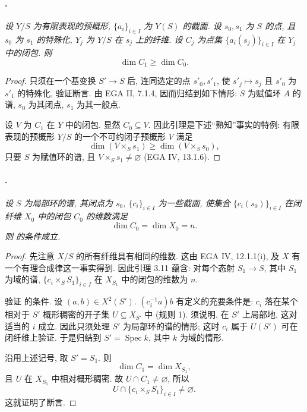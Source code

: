 \paragraph{.}
\textit{设 \(Y/S\) 为有限表现的预概形, \(\{a_i\}_{i\in I}\) 为 \(Y(S)\) 的截面.
设 \(s_0,s_1\) 为 \(S\) 的点, 且 \(s_0\) 为 \(s_1\) 的特殊化,
\(Y_j\) 为 \(Y/S\) 在 \(s_j\) 上的纤维.
设 \(C_j\) 为点集 \(\{a_i(s_j)\}_{i\in I}\) 在 \(Y_j\) 中的闭包. 则
\[
  \dim C_1\geq \dim C_0.
\]}

\begin{proof}
只须在一个基变换 \(S'\to S\) 后,
连同选定的点 \(s'_0,s'_1\), 使 \(s'_j\mapsto s_j\)
且 \(s'_0\) 为 \(s'_1\) 的特殊化, 验证断言.
由 EGA II, 7.1.4, 因而归结到如下情形:
\(S\) 为赋值环 \(A\) 的谱, \(s_0\) 为其闭点, \(s_1\) 为其一般点.

设 \(V\) 为 \(C_1\) 在 \(Y\) 中的闭包. 显然 \(C_0\subseteq V\).
因此引理是下述“熟知”事实的特例:
有限表现的预概形 \(Y/S\) 的一个不可约闭子预概形 \(V\) 满足
\[
  \dim(V\times_S s_1)\geq \dim(V\times_S s_0),
\]
只要 \(S\) 为赋值环的谱, 且 \(V\times_S s_1\neq\varnothing\)
(EGA IV, 13.1.6).
\end{proof}

\paragraph{.}
\textit{设 \(S\) 为局部环的谱, 其闭点为 \(s_0\),
\(\{c_i\}_{i\in I}\) 为一些截面,
使集合 \(\{c_i(s_0)\}_{i\in I}\) 在闭纤维 \(X_0\) 中的闭包 \(C_0\) 的维数满足
\[
  \dim C_0=\dim X_0=n.
\]
则 的条件成立.}

\begin{proof}
先注意 \(X/S\) 的所有纤维具有相同的维数.
这由 EGA IV, 12.1.1(i), 及 \(X\) 有一个有理合成律这一事实得到.
因此引理 3.11 蕴含: 对每个态射 \(S_1\to S\), 其中 \(S_1\) 为域的谱,
\(\{c_i\times_S S_1\}_{i\in I}\) 在 \(X_{S_1}\) 中的闭包的维数为 \(n\).

验证 的条件.
设 \((a,b)\in X^2(S')\).
\((c_i^{-1}a)b\) 有定义的充要条件是:
\(c_i\) 落在某个相对于 \(S'\) 概形稠密的开子集 \(U\subseteq X_{S'}\) 中 (规则 1).
须说明, 在 \(S'\) 上局部地, 这对适当的 \(i\) 成立.
因此只须处理 \(S'\) 为局部环的谱的情形;
这时 \(c_i\) 属于 \(U(S')\) 可在闭纤维上验证.
于是归结到 \(S'=\operatorname{Spec}k\), 其中 \(k\) 为域的情形.

沿用上述记号, 取 \(S'=S_1\). 则
\[
  \dim C_1=\dim X_{S_1},
\]
且 \(U\) 在 \(X_{S_1}\) 中相对概形稠密.
故 \(U\cap C_1\neq\varnothing\), 所以
\[
  U\cap\{c_i\times_S S_1\}_{i\in I}\neq\varnothing.
\]
这就证明了断言.
\end{proof}

